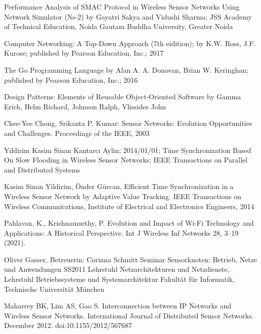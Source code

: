 \documentclass[12pt,oneside,a4paper]{book}
\theoremstyle{break}
\begin{document}
\begin{thebibliography}{00}

    Performance Analysis of SMAC Protocol in Wireless
    Sensor Networks Using Network Simulator (Ns-2) by Gayatri Sakya
    and Vidushi Sharma; JSS Academy of Technical Education, Noida
    Gautam Buddha University, Greater Noida

    Computer Networking: A Top-Down Approach (7th eidition); by
    K.W. Ross, J.F. Kurose; published by Pearson Education, Inc.; 2017

    The Go Programming Language by Alan A. A. Donovan, Brian W. Keringhan; published by
    Pearson Education, Inc.; 2016

    Design Patterns: Elements of Reusable Object-Oriented Software
    by Gamma Erich, Helm Richard, Johnson Ralph, Vlissides John

    Chee-Yee Chong, Srikanta P. 
    Kumar: Sensor Networks: Evolution Opportunities and Challenges. 
    Proceedings of the IEEE, 2003

    Yildirim Kasim Sinan Kantarcı Aylin; 2014/01/01; Time Synchronization Based On Slow Flooding in Wireless Sensor Networks;
    IEEE Transactions on Parallel and Distributed Systems

    Kasim Sinan Yildirim, Önder Gürcan. Eﬀicient Time Synchronization in a Wireless Sensor Network
    by Adaptive Value Tracking. IEEE Transactions on Wireless Communications, Institute of Electrical
    and Electronics Engineers, 2014

    Pahlavan, K., Krishnamurthy, P. 
    Evolution and Impact of Wi-Fi Technology and Applications: A Historical Perspective.
    Int J Wireless Inf Networks 28, 3–19 (2021).

    Oliver Gasser, 
    Betreuerin: Corinna Schmitt
    Seminar Sensorknoten: Betrieb, Netze und Anwendungen SS2011
    Lehrstuhl Netzarchitekturen und Netzdienste, Lehrstuhl Betriebssysteme und Systemarchitektur
    Fakultät für Informatik, Technische Universität München

    Maharrey BK, Lim AS, Gao S. Interconnection between IP Networks and Wireless Sensor Networks. International Journal of Distributed Sensor Networks. December 2012. doi:10.1155/2012/567687
  

\end{thebibliography}
\end{document}
